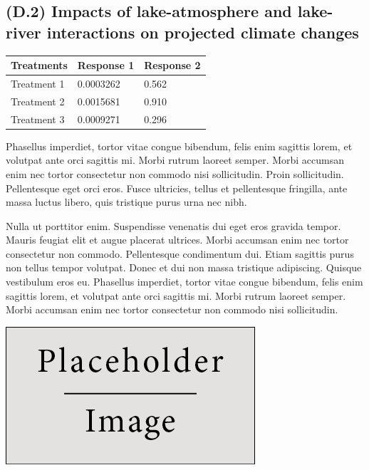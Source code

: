 \documentclass[a0,landscape]{a0poster}
\begin{document}
\begin{multicols*}{3}
\subsection*{(D.2) Impacts of lake-atmosphere and lake-river interactions on projected climate changes}




%
\begin{table} %
\begin{tabular}{l l l}
\toprule
\textbf{Treatments} & \textbf{Response 1} & \textbf{Response 2}\\
\midrule
Treatment 1 & 0.0003262 & 0.562 \\
Treatment 2 & 0.0015681 & 0.910 \\
Treatment 3 & 0.0009271 & 0.296 \\
\bottomrule
\end{tabular}
\end{table}
%
Phasellus imperdiet, tortor vitae congue bibendum, felis enim sagittis lorem, et volutpat ante orci sagittis mi. Morbi rutrum laoreet semper. Morbi accumsan enim nec tortor consectetur non commodo nisi sollicitudin. Proin sollicitudin. Pellentesque eget orci eros. Fusce ultricies, tellus et pellentesque fringilla, ante massa luctus libero, quis tristique purus urna nec nibh.

Nulla ut porttitor enim. Suspendisse venenatis dui eget eros gravida tempor. Mauris feugiat elit et augue placerat ultrices. Morbi accumsan enim nec tortor consectetur non commodo. Pellentesque condimentum dui. Etiam sagittis purus non tellus tempor volutpat. Donec et dui non massa tristique adipiscing. Quisque vestibulum eros eu. Phasellus imperdiet, tortor vitae congue bibendum, felis enim sagittis lorem, et volutpat ante orci sagittis mi. Morbi rutrum laoreet semper. Morbi accumsan enim nec tortor consectetur non commodo nisi sollicitudin.

\begin{center}\vspace{1cm}
\includegraphics[width=0.8\linewidth]{placeholder}
\end{center}\vspace{1cm}


\end{multicols*}
\end{document}
